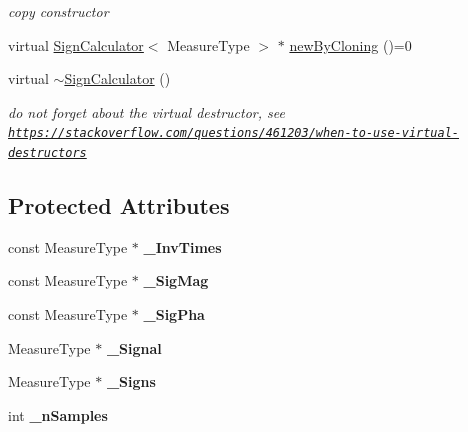\begin{DoxyCompactItemize}
\begin{DoxyCompactList}\small\item\em copy constructor \end{DoxyCompactList}\item 
virtual \hyperlink{class_ox_1_1_sign_calculator}{Sign\+Calculator}$<$ Measure\+Type $>$ $\ast$ \hyperlink{class_ox_1_1_sign_calculator_a40d9d97a505a69b687429bf545597687}{new\+By\+Cloning} ()=0
\item 
virtual \hyperlink{class_ox_1_1_sign_calculator_a5143a172e360633d8df758756d146889}{$\sim$\+Sign\+Calculator} ()\hypertarget{class_ox_1_1_sign_calculator_a5143a172e360633d8df758756d146889}{}\label{class_ox_1_1_sign_calculator_a5143a172e360633d8df758756d146889}

\begin{DoxyCompactList}\small\item\em do not forget about the virtual destructor, see \href{https://stackoverflow.com/questions/461203/when-to-use-virtual-destructors}{\tt https\+://stackoverflow.\+com/questions/461203/when-\/to-\/use-\/virtual-\/destructors} \end{DoxyCompactList}\end{DoxyCompactItemize}
\subsection*{Protected Attributes}
\begin{DoxyCompactItemize}
\item 
const Measure\+Type $\ast$ {\bfseries \+\_\+\+Inv\+Times}\hypertarget{class_ox_1_1_sign_calculator_a46be35659f793c2e1280a975f799db4d}{}\label{class_ox_1_1_sign_calculator_a46be35659f793c2e1280a975f799db4d}

\item 
const Measure\+Type $\ast$ {\bfseries \+\_\+\+Sig\+Mag}\hypertarget{class_ox_1_1_sign_calculator_a635a62974bc9b9f30d0d560a84fcf3f1}{}\label{class_ox_1_1_sign_calculator_a635a62974bc9b9f30d0d560a84fcf3f1}

\item 
const Measure\+Type $\ast$ {\bfseries \+\_\+\+Sig\+Pha}\hypertarget{class_ox_1_1_sign_calculator_a19b203aacea5e39bc9675a27c57197d3}{}\label{class_ox_1_1_sign_calculator_a19b203aacea5e39bc9675a27c57197d3}

\item 
Measure\+Type $\ast$ {\bfseries \+\_\+\+Signal}\hypertarget{class_ox_1_1_sign_calculator_aaf53cad7c5d49133017677f8abb589bf}{}\label{class_ox_1_1_sign_calculator_aaf53cad7c5d49133017677f8abb589bf}

\item 
Measure\+Type $\ast$ {\bfseries \+\_\+\+Signs}\hypertarget{class_ox_1_1_sign_calculator_a6dda6e1e4d83dd7ad4654f7fd2b44bb3}{}\label{class_ox_1_1_sign_calculator_a6dda6e1e4d83dd7ad4654f7fd2b44bb3}

\item 
int {\bfseries \+\_\+n\+Samples}\hypertarget{class_ox_1_1_sign_calculator_a133488500068bccf0e041d9244a09e02}{}\label{class_ox_1_1_sign_calculator_a133488500068bccf0e041d9244a09e02}

\end{DoxyCompactItemize}


